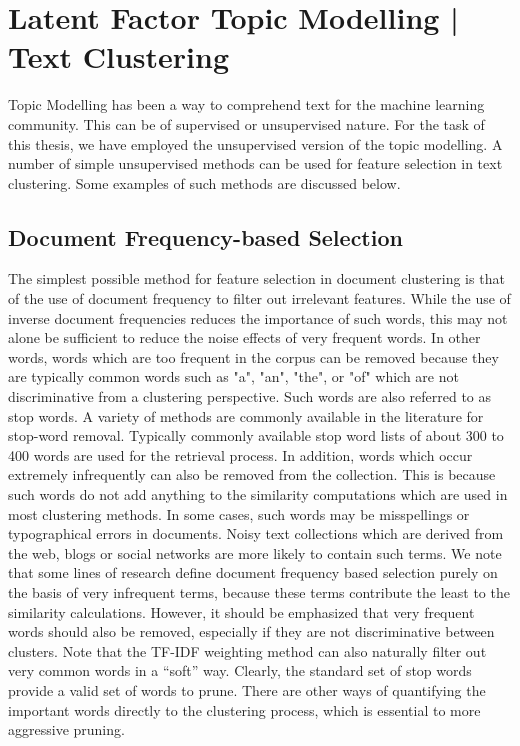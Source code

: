 \section{Latent Factor Topic Modelling | Text Clustering}

Topic Modelling has been a way to comprehend text for the machine learning community. This can be of supervised or unsupervised nature. For the task of this thesis, we have employed the unsupervised version of the topic modelling. A number of simple unsupervised methods can be used for feature selection in text clustering. Some examples of such methods are discussed below.

\subsection{Document Frequency-based Selection}
The simplest possible method for feature selection in document clustering is that of the use of document frequency to filter out irrelevant features. While the use of inverse document frequencies reduces the importance of such words, this may not alone be sufficient to reduce the noise effects of very frequent words. In other words, words which are too frequent in the corpus can be removed because they are typically common words such as "a", "an", "the", or "of" which are not discriminative from a clustering perspective. Such words are also referred to as stop words. A variety of methods are commonly available in the literature for stop-word removal. Typically commonly available stop word lists of about 300 to 400 words are used for the retrieval process. In addition, words which occur extremely infrequently can also be removed from the collection. This is because such words do not add anything to the similarity computations which are used in most clustering methods. In some cases, such words may be misspellings or typographical errors in documents. Noisy text collections which are derived from the web, blogs or social networks are more likely to contain such terms. We note that some lines of research define document frequency based selection purely on the basis of very infrequent terms, because these terms contribute the least to the similarity calculations. However, it should be emphasized that very frequent words should also be removed, especially if they are not discriminative between clusters. Note that the TF-IDF weighting method can also naturally filter out very common words in a “soft” way. Clearly, the standard set of stop words provide a valid set of words to prune. There are other ways of quantifying the important words directly to the clustering process, which is essential to more aggressive pruning.

